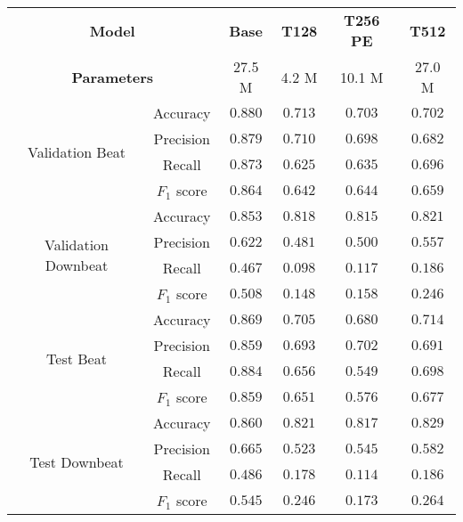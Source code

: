 \begin{tabular}{cc|cccc}
    \multicolumn{2}{c|}{\textbf{Model}} & \textbf{Base} & \textbf{T128} & \textbf{T256 PE} & \textbf{T512}\\
    \multicolumn{2}{c|}{\textbf{Parameters}} & 27.5 M & 4.2 M & 10.1 M & 27.0 M \\\hline
    \multirow{4}{*}{Validation Beat}     & Accuracy    & $\mathbf{0.880}$ & $0.713$ & $0.703$ & $0.702$ \\
    & Precision   & $\mathbf{0.879}$ & $0.710$ & $0.698$ & $0.682$ \\
    & Recall      & $\mathbf{0.873}$ & $0.625$ & $0.635$ & $0.696$ \\
    & $F_1$ score & $\mathbf{0.864}$ & $0.642$ & $0.644$ & $0.659$ \\\hline
    \multirow{4}{*}{Validation Downbeat} & Accuracy    & $\mathbf{0.853}$ & $0.818$ & $0.815$ & $0.821$ \\
    & Precision   & $\mathbf{0.622}$ & $0.481$ & $0.500$ & $0.557$ \\
    & Recall      & $\mathbf{0.467}$ & $0.098$ & $0.117$ & $0.186$ \\
    & $F_1$ score & $\mathbf{0.508}$ & $0.148$ & $0.158$ & $0.246$ \\\hline
    \multirow{4}{*}{Test Beat}           & Accuracy    & $\mathbf{0.869}$ & $0.705$ & $0.680$ & $0.714$ \\
    & Precision   & $\mathbf{0.859}$ & $0.693$ & $0.702$ & $0.691$ \\
    & Recall      & $\mathbf{0.884}$ & $0.656$ & $0.549$ & $0.698$ \\
    & $F_1$ score & $\mathbf{0.859}$ & $0.651$ & $0.576$ & $0.677$ \\\hline
    \multirow{4}{*}{Test Downbeat}       & Accuracy    & $\mathbf{0.860}$ & $0.821$ & $0.817$ & $0.829$ \\
    & Precision   & $\mathbf{0.665}$ & $0.523$ & $0.545$ & $0.582$ \\
    & Recall      & $\mathbf{0.486}$ & $0.178$ & $0.114$ & $0.186$ \\
    & $F_1$ score & $\mathbf{0.545}$ & $0.246$ & $0.173$ & $0.264$ \\
\end{tabular}
